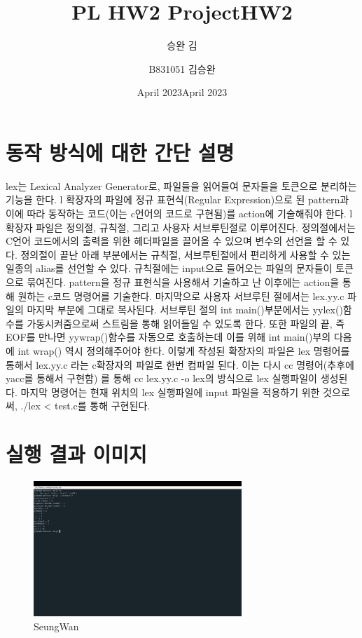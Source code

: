 \documentclass{article}
\title{PL HW2 Project}
\author{승완 김}
\date{April 2023}
\begin{document}
\title{HW2}
\author{B831051 김승완}
\date{April 2023}
\maketitle


\section{동작 방식에 대한 간단 설명}
lex는 Lexical Analyzer Generator로, 파일들을 읽어들여 문자들을 토큰으로 분리하는 기능을 한다. l 확장자의 파일에 정규 표현식(Regular Expression)으로 된 pattern과 이에 따라 동작하는 코드(이는 c언어의 코드로 구현됨)를 action에 기술해줘야 한다. l 확장자 파일은 정의절, 규칙절, 그리고 사용자 서브루틴절로 이루어진다. 정의절에서는 C언어 코드에서의 출력을 위한 헤더파일을 끌어올 수 있으며 변수의 선언을 할 수 있다. 정의절이 끝난 아래 부분에서는 규칙절, 서브루틴절에서 편리하게 사용할 수 있는 일종의 alias를 선언할 수 있다. 규칙절에는 input으로 들어오는 파일의 문자들이 토큰으로 묶여진다. pattern을 정규 표현식을 사용해서 기술하고 난 이후에는 action을 통해 원하는 c코드 명령어를  기술한다. 마지막으로 사용자 서브루틴 절에서는 lex.yy.c 파일의 마지막 부분에 그대로 복사된다. 서브루틴 절의 int main()부분에서는 yylex()함수를 가동시켜줌으로써 스트림을 통해 읽어들일 수 있도록 한다. 또한 파일의 끝, 즉 EOF를 만나면 yywrap()함수를 자동으로 호출하는데 이를 위해 int main()부의 다음에 int wrap() 역시 정의해주어야 한다. 
\newline
이렇게 작성된 확장자의 파일은 lex 명령어를 통해서 lex.yy.c 라는 c확장자의 파일로 한번 컴파일 된다. 이는 다시 cc 명령어(추후에 yacc를 통해서 구현함) 를 통해 cc lex.yy.c -o lex의 방식으로 lex 실행파일이 생성된다. 마지막 명령어는 현재 위치의 lex 실행파일에 input 파일을 적용하기 위한 것으로써, ./lex < test.c를 통해 구현된다. 
\newline\newline\newline\newline\newline\newline\newline\newline
\newline\newline
\section{실행 결과 이미지}
\begin{figure}
    \centering
    \includegraphics[width=0.7\textwidth]{hw2_result_screenshot.png}
    \caption{SeungWan}
    \label{fig:result_screenshot}
\end{figure}
\end{document}
